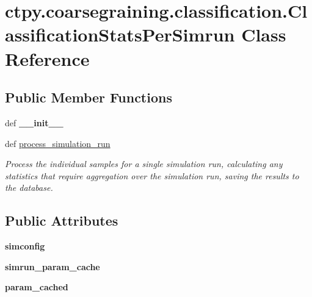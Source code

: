 \hypertarget{classctpy_1_1coarsegraining_1_1classification_1_1_classification_stats_per_simrun}{\section{ctpy.\-coarsegraining.\-classification.\-Classification\-Stats\-Per\-Simrun Class Reference}
\label{classctpy_1_1coarsegraining_1_1classification_1_1_classification_stats_per_simrun}
}
\subsection*{Public Member Functions}
\begin{DoxyCompactItemize}
\item 
\hypertarget{classctpy_1_1coarsegraining_1_1classification_1_1_classification_stats_per_simrun_ab5221d9eb26315dc3e912d6cd85ae9fb}{def {\bfseries \-\_\-\-\_\-init\-\_\-\-\_\-}}\label{classctpy_1_1coarsegraining_1_1classification_1_1_classification_stats_per_simrun_ab5221d9eb26315dc3e912d6cd85ae9fb}

\item 
def \hyperlink{classctpy_1_1coarsegraining_1_1classification_1_1_classification_stats_per_simrun_a92bf4508aa14b53c4e1b13a0dd96dccb}{process\-\_\-simulation\-\_\-run}
\begin{DoxyCompactList}\small\item\em Process the individual samples for a single simulation run, calculating any statistics that require aggregation over the simulation run, saving the results to the database. \end{DoxyCompactList}\end{DoxyCompactItemize}
\subsection*{Public Attributes}
\begin{DoxyCompactItemize}
\item 
\hypertarget{classctpy_1_1coarsegraining_1_1classification_1_1_classification_stats_per_simrun_a4434a9162d24c6335a9aaf1240d8a6b7}{{\bfseries simconfig}}\label{classctpy_1_1coarsegraining_1_1classification_1_1_classification_stats_per_simrun_a4434a9162d24c6335a9aaf1240d8a6b7}

\item 
\hypertarget{classctpy_1_1coarsegraining_1_1classification_1_1_classification_stats_per_simrun_a1a042e351fb73ec03e5ac175dcf14389}{{\bfseries simrun\-\_\-param\-\_\-cache}}\label{classctpy_1_1coarsegraining_1_1classification_1_1_classification_stats_per_simrun_a1a042e351fb73ec03e5ac175dcf14389}

\item 
\hypertarget{classctpy_1_1coarsegraining_1_1classification_1_1_classification_stats_per_simrun_aeca79e2cd17c19e06c97cbd8fff83788}{{\bfseries param\-\_\-cached}}\label{classctpy_1_1coarsegraining_1_1classification_1_1_classification_stats_per_simrun_aeca79e2cd17c19e06c97cbd8fff83788}

\end{DoxyCompactItemize}


